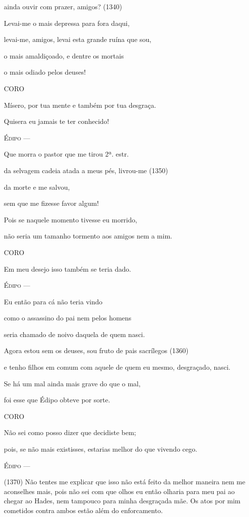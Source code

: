 ainda ouvir com prazer, amigos? (1340)

Levai-me o mais depressa para fora daqui,

levai-me, amigos, levai esta grande ruína que sou,

o mais amaldiçoado, e dentre os mortais

o mais odiado pelos deuses!

\textsc{CORO}

Mísero, por tua mente e também por tua desgraça.

Quisera eu jamais te ter conhecido!

\textsc{Édipo} ---

Que morra o pastor que me tirou 2ª. estr.

da selvagem cadeia atada a meus pés, livrou-me (1350)

da morte e me salvou,

sem que me fizesse favor algum!

Pois se naquele momento tivesse eu morrido,

não seria um tamanho tormento aos amigos nem a mim.

\textsc{CORO}

Em meu desejo isso também se teria dado.

\textsc{Édipo} ---

Eu então para cá não teria vindo

como o assassino do pai nem pelos homens

seria chamado de noivo daquela de quem nasci.

Agora estou sem os deuses, sou fruto de pais sacrílegos (1360)

e tenho filhos em comum com aquele de quem eu mesmo, desgraçado, nasci.

Se há um mal ainda mais grave do que o mal,

foi esse que Édipo obteve por sorte.

\textsc{CORO}

Não sei como posso dizer que decidiste bem;

pois, se não mais existisses, estarias melhor do que vivendo cego.

\textsc{Édipo} ---

(1370) Não tentes me explicar que isso não está feito da melhor maneira
nem me aconselhes mais, pois não sei com que olhos eu então olharia para
meu pai ao chegar ao Hades, nem tampouco para minha desgraçada mãe. Os
atos por mim cometidos contra ambos estão além do enforcamento.

